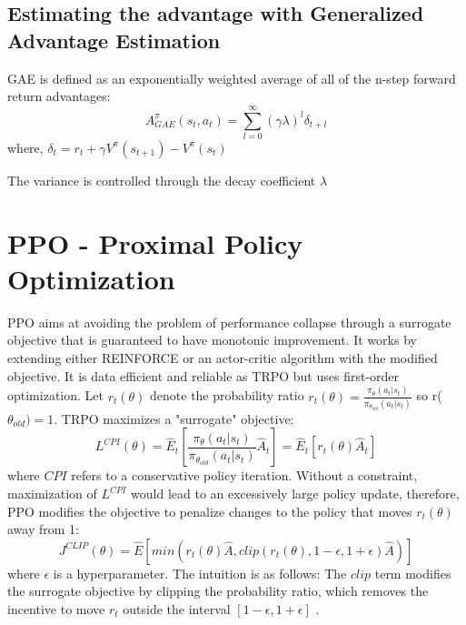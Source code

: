 \documentclass[12pt,a4paper]{report}
\begin{document}
			\subsection{Estimating the advantage with Generalized Advantage Estimation}
			GAE is defined as an exponentially weighted average of all of the n-step forward return advantages:
			\begin{equation}
				A_{GAE}^\pi (s_t, a_t) = \sum_{l=0}^{\infty}(\gamma \lambda)^l \delta_{t+l}
			\end{equation}
			where, $\delta_t = r_t + \gamma V^\pi (s_{t+1}) - V^\pi (s_t)$
			
			The variance is controlled through the decay coefficient $\lambda$
		\section{PPO - Proximal Policy Optimization}
		PPO \cite{schulman_proximal_2017} aims at avoiding the problem of performance collapse through a surrogate objective that is guaranteed to have monotonic improvement. 
		It works by extending either REINFORCE or an actor-critic algorithm with the modified objective. It is data efficient and reliable as TRPO \cite{schulman_trust_2017} but uses first-order optimization.
		Let $r_t(\theta)$ denote the probability ratio $r_t(\theta) = \frac{\pi_\theta(a_t|s_t)}{\pi_{\theta_{old}}(a_t|s_t)}$ so r($\theta_{old}) = 1$. TRPO maximizes a "surrogate" objective: 
		\begin{equation}
			L^{CPI}(\theta) = \hat{E}_t \left[\frac{\pi_\theta(a_t | s_t)}{\pi_{\theta_{old}}(a_t | s_t)}\hat{A}_t\right] = \hat{E}_t\left[r_t(\theta)\hat{A}_t\right]
		\end{equation}
		where $CPI$ refers to a conservative policy iteration.\cite{schulman_proximal_2017}
		Without a constraint, maximization of $L^{CPI}$ would lead to an excessively large policy update, therefore, PPO modifies the objective to penalize changes to the policy that moves $r_t(\theta)$ away from 1:
		\begin{equation}
			J^{CLIP}(\theta) = \hat{E}\left[ min \left( r_t(\theta)\hat{A}, clip\left( r_t(\theta), 1 - \epsilon, 1 + \epsilon \right) \hat{A} \right) \right]
		\end{equation}
		where $\epsilon$ is a hyperparameter. The intuition is as follows: The $clip$ term modifies the surrogate objective by clipping the probability ratio, which removes the incentive to move $r_t$ outside the interval $[1-\epsilon, 1 + \epsilon]$ \cite{schulman_proximal_2017}.
		
\end{document}
